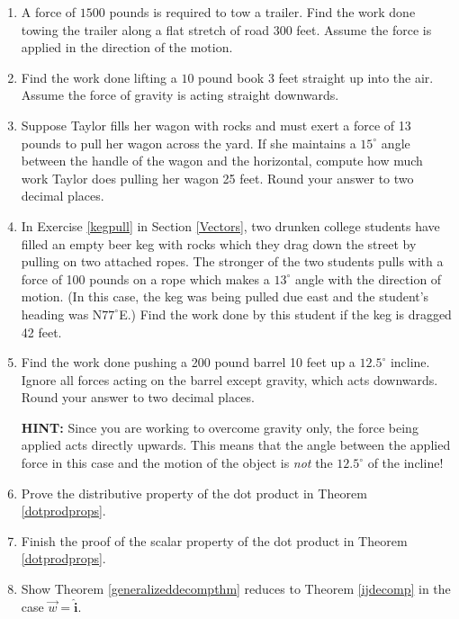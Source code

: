 \begin{enumerate}

\setcounter{enumi}{\value{HW}}

\item  A force of $1500$ pounds is required to tow a trailer.  Find the work done towing the trailer along a flat stretch of road $300$ feet.  Assume the force is applied in the direction of the motion.

\item  Find the work done lifting a $10$ pound book $3$ feet straight up into the air.  Assume the force of gravity is acting straight downwards.

\item  Suppose Taylor fills her wagon with rocks and must exert a force of 13 pounds to pull her wagon across the yard.  If she maintains a $15^{\circ}$ angle between the handle of the wagon and the horizontal, compute how much work Taylor does pulling her wagon 25 feet.  Round your answer to two decimal places.

\item In Exercise \ref{kegpull} in Section \ref{Vectors}, two drunken college students have filled an empty beer keg with rocks which they drag down the street by pulling on two attached ropes.  The stronger of the two students pulls with a force of 100 pounds on a rope which makes a $13^{\circ}$ angle with the direction of motion.  (In this case, the keg was being pulled due east and the student's heading was N$77^{\circ}$E.)  Find the work done by this student if the keg is dragged 42 feet.

\item  Find the work done pushing a 200 pound barrel 10 feet up a $12.5^{\circ}$ incline. Ignore all forces acting on the barrel except gravity, which acts downwards.  Round your answer to two decimal places.

\textbf{HINT:}  Since you are working to overcome gravity only, the force being applied acts directly upwards. This means that the angle between the applied force in this case and the motion of the object is \textit{not} the $12.5^{\circ}$ of the incline!

\item Prove the distributive property of the dot product in Theorem \ref{dotprodprops}.

\item Finish the proof of the scalar property of the dot product in Theorem \ref{dotprodprops}.

\item Show Theorem \ref{generalizeddecompthm} reduces to Theorem \ref{ijdecomp} in the case $\vec{w} =  \bm\hat{\text{i}}$.


\end{enumerate}
